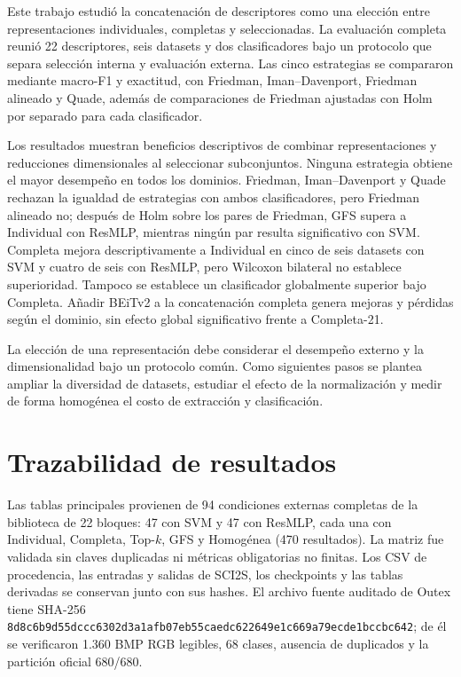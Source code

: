 \documentclass[a4paper,fleqn]{cas-sc}
\begin{document}
Este trabajo estudió la concatenación de descriptores como una elección entre representaciones individuales, completas y seleccionadas. La evaluación completa reunió 22 descriptores, seis datasets y dos clasificadores bajo un protocolo que separa selección interna y evaluación externa. Las cinco estrategias se compararon mediante macro-F1 y exactitud, con Friedman, Iman--Davenport, Friedman alineado y Quade, además de comparaciones de Friedman ajustadas con Holm por separado para cada clasificador.

Los resultados muestran beneficios descriptivos de combinar representaciones y reducciones dimensionales al seleccionar subconjuntos. Ninguna estrategia obtiene el mayor desempeño en todos los dominios. Friedman, Iman--Davenport y Quade rechazan la igualdad de estrategias con ambos clasificadores, pero Friedman alineado no; después de Holm sobre los pares de Friedman, GFS supera a Individual con ResMLP, mientras ningún par resulta significativo con SVM. Completa mejora descriptivamente a Individual en cinco de seis datasets con SVM y cuatro de seis con ResMLP, pero Wilcoxon bilateral no establece superioridad. Tampoco se establece un clasificador globalmente superior bajo Completa. Añadir BEiTv2 a la concatenación completa genera mejoras y pérdidas según el dominio, sin efecto global significativo frente a Completa-21.

La elección de una representación debe considerar el desempeño externo y la dimensionalidad bajo un protocolo común. Como siguientes pasos se plantea ampliar la diversidad de datasets, estudiar el efecto de la normalización y medir de forma homogénea el costo de extracción y clasificación.

\clearpage
\appendix
\section{Trazabilidad de resultados}\label{app:reproducibilidad}

Las tablas principales provienen de 94 condiciones externas completas de la biblioteca de 22 bloques: 47 con SVM y 47 con ResMLP, cada una con Individual, Completa, Top-$k$, GFS y Homogénea (470 resultados). La matriz fue validada sin claves duplicadas ni métricas obligatorias no finitas. Los CSV de procedencia, las entradas y salidas de SCI2S, los checkpoints y las tablas derivadas se conservan junto con sus hashes. El archivo fuente auditado de Outex tiene SHA-256 \texttt{8d8c6b9d55dccc6302d3a1afb07eb55c}\allowbreak\texttt{aedc622649e1c669a79ecde1bccbc642}; de él se verificaron 1.360 BMP RGB legibles, 68 clases, ausencia de duplicados y la partición oficial 680/680.
\end{document}
